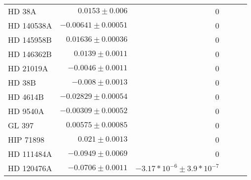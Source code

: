 \begin{longtable*}{lrrrrr}
HD 38A & $0.0153\pm 0.006$ & 0 \\ 
HD 140538A & $-0.00641\pm 0.00051$ & 0 \\ 
HD 145958B & $0.01636\pm 0.00036$ & 0 \\ 
HD 146362B & $0.0139\pm 0.0011$ & 0 \\ 
HD 21019A & $-0.0046\pm 0.0011$ & 0 \\ 
HD 38B & $-0.008\pm 0.0013$ & 0 \\ 
HD 4614B & $-0.02829\pm 0.00054$ & 0 \\ 
HD 9540A & $-0.00309\pm 0.00052$ & 0 \\ 
GL 397 & $0.00575\pm 0.00085$ & 0 \\ 
HIP 71898 & $0.021\pm 0.0013$ & 0 \\ 
HD 111484A & $-0.0949\pm 0.0069$ & 0 \\ 
HD 120476A & $-0.0706\pm 0.0011$ & $-3.17*10^{-6}\pm 3.9*10^{-7}$ \\ 
\bottomrule 
\end{longtable*} 
